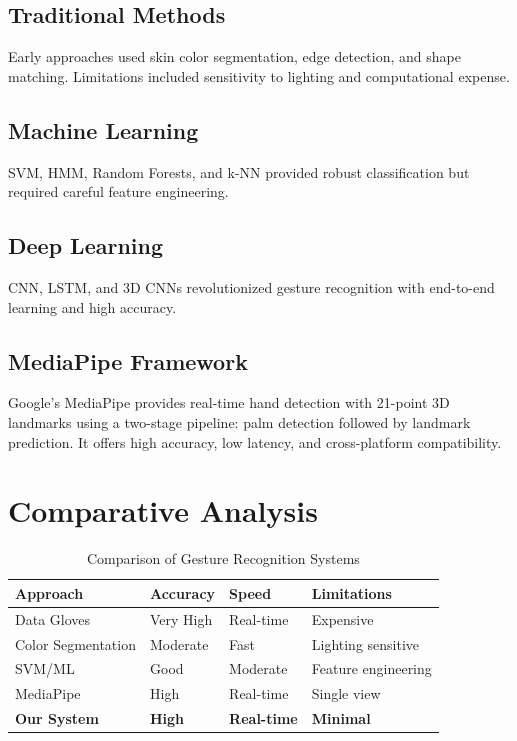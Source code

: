 \documentclass[12pt,a4paper]{report}
\begin{document}
\subsection{Traditional Methods}
Early approaches used skin color segmentation, edge detection, and shape matching. Limitations included sensitivity to lighting and computational expense.

\subsection{Machine Learning}
SVM, HMM, Random Forests, and k-NN provided robust classification but required careful feature engineering.

\subsection{Deep Learning}
CNN, LSTM, and 3D CNNs revolutionized gesture recognition with end-to-end learning and high accuracy.

\subsection{MediaPipe Framework}
Google's MediaPipe provides real-time hand detection with 21-point 3D landmarks using a two-stage pipeline: palm detection followed by landmark prediction. It offers high accuracy, low latency, and cross-platform compatibility.

\section{Comparative Analysis}

\begin{table}[H]
\centering
\caption{Comparison of Gesture Recognition Systems}
\label{tab:comparison}
\begin{tabular}{|l|l|l|l|}
\hline
\textbf{Approach} & \textbf{Accuracy} & \textbf{Speed} & \textbf{Limitations} \\ \hline
Data Gloves & Very High & Real-time & Expensive \\ \hline
Color Segmentation & Moderate & Fast & Lighting sensitive \\ \hline
SVM/ML & Good & Moderate & Feature engineering \\ \hline
MediaPipe & High & Real-time & Single view \\ \hline
\textbf{Our System} & \textbf{High} & \textbf{Real-time} & \textbf{Minimal} \\ \hline
\end{tabular}
\end{table}
\end{document}
